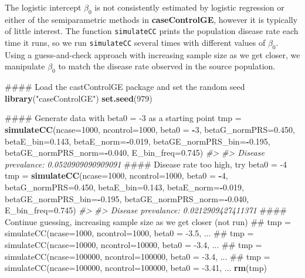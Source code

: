 \documentclass[11pt,]{article}
\newenvironment{Shaded}{\begin{snugshade}}{\end{snugshade}}
\newcommand{\KeywordTok}[1]{\textcolor[rgb]{0.13,0.29,0.53}{\textbf{#1}}}
\newcommand{\DataTypeTok}[1]{\textcolor[rgb]{0.13,0.29,0.53}{#1}}
\newcommand{\DecValTok}[1]{\textcolor[rgb]{0.00,0.00,0.81}{#1}}
\newcommand{\FloatTok}[1]{\textcolor[rgb]{0.00,0.00,0.81}{#1}}
\newcommand{\StringTok}[1]{\textcolor[rgb]{0.31,0.60,0.02}{#1}}
\newcommand{\CommentTok}[1]{\textcolor[rgb]{0.56,0.35,0.01}{\textit{#1}}}
\newcommand{\OperatorTok}[1]{\textcolor[rgb]{0.81,0.36,0.00}{\textbf{#1}}}
\newcommand{\NormalTok}[1]{#1}
\begin{document}
The logistic intercept \(\beta_0\) is not consistently estimated by
logistic regression or either of the semiparametric methods in
\textbf{caseControlGE}, however it is typically of little interest. The
function \texttt{simulateCC} prints the population disease rate each
time it runs, so we run \texttt{simulateCC} several times with different
values of \(\beta_0\). Using a guess-and-check approach with increasing
sample size as we get closer, we manipulate \(\beta_0\) to match the
disease rate observed in the source population.

\begin{Shaded}
\begin{Highlighting}[]
\NormalTok{#### Load the castControlGE package and set the random seed}
\KeywordTok{library}\NormalTok{(}\StringTok{"caseControlGE"}\NormalTok{)}
\KeywordTok{set.seed}\NormalTok{(}\DecValTok{979}\NormalTok{)}

\NormalTok{#### Generate data with beta0 = -3 as a starting point}
\NormalTok{tmp =}\StringTok{ }\KeywordTok{simulateCC}\NormalTok{(}\DataTypeTok{ncase=}\DecValTok{1000}\NormalTok{, }\DataTypeTok{ncontrol=}\DecValTok{1000}\NormalTok{, }\DataTypeTok{beta0 =} \OperatorTok{-}\DecValTok{3}\NormalTok{, }\DataTypeTok{betaG_normPRS=}\FloatTok{0.450}\NormalTok{,}
                 \DataTypeTok{betaE_bin=}\FloatTok{0.143}\NormalTok{, }\DataTypeTok{betaE_norm=}\OperatorTok{-}\FloatTok{0.019}\NormalTok{, }\DataTypeTok{betaGE_normPRS_bin=}\OperatorTok{-}\FloatTok{0.195}\NormalTok{,}
                 \DataTypeTok{betaGE_normPRS_norm=}\OperatorTok{-}\FloatTok{0.040}\NormalTok{, }\DataTypeTok{E_bin_freq=}\FloatTok{0.745}\NormalTok{)}
\CommentTok{#> }
\CommentTok{#> Disease prevalance: 0.0520909090909091}
\NormalTok{#### Disease rate too high, try beta0 = -4}
\NormalTok{tmp =}\StringTok{ }\KeywordTok{simulateCC}\NormalTok{(}\DataTypeTok{ncase=}\DecValTok{1000}\NormalTok{, }\DataTypeTok{ncontrol=}\DecValTok{1000}\NormalTok{, }\DataTypeTok{beta0 =} \OperatorTok{-}\DecValTok{4}\NormalTok{, }\DataTypeTok{betaG_normPRS=}\FloatTok{0.450}\NormalTok{,}
                 \DataTypeTok{betaE_bin=}\FloatTok{0.143}\NormalTok{, }\DataTypeTok{betaE_norm=}\OperatorTok{-}\FloatTok{0.019}\NormalTok{, }\DataTypeTok{betaGE_normPRS_bin=}\OperatorTok{-}\FloatTok{0.195}\NormalTok{,}
                 \DataTypeTok{betaGE_normPRS_norm=}\OperatorTok{-}\FloatTok{0.040}\NormalTok{, }\DataTypeTok{E_bin_freq=}\FloatTok{0.745}\NormalTok{)}
\CommentTok{#> }
\CommentTok{#> Disease prevalance: 0.0212909427411371}
\NormalTok{#### Continue guessing, increasing sample size as we get closer (not run)}
\NormalTok{## tmp = simulateCC(ncase=1000, ncontrol=1000, beta0 = -3.5, ...}
\NormalTok{## tmp = simulateCC(ncase=10000, ncontrol=10000, beta0 = -3.4, ...}
\NormalTok{## tmp = simulateCC(ncase=100000, ncontrol=100000, beta0 = -3.4, ...}
\NormalTok{## tmp = simulateCC(ncase=100000, ncontrol=100000, beta0 = -3.41, ...}
\KeywordTok{rm}\NormalTok{(tmp)}
\end{Highlighting}
\end{Shaded}
\end{document}
